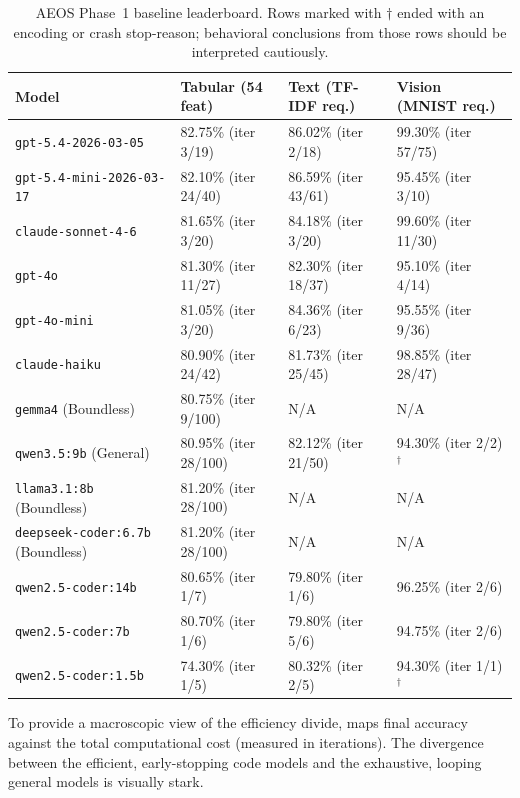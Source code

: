 \documentclass[11pt]{article}
\begin{document}
\begin{table}[H]
  \centering
  \caption{AEOS Phase~1 baseline leaderboard. Rows marked with $\dagger$ ended with an encoding or crash stop-reason; behavioral conclusions from those rows should be interpreted cautiously.}
  \label{tab:leaderboard}
  \small
  \begin{tabular}{@{}llll@{}}
    \toprule
    \textbf{Model} & \textbf{Tabular (54 feat)} & \textbf{Text (TF-IDF req.)} & \textbf{Vision (MNIST req.)} \\
    \midrule
    \texttt{gpt-5.4-2026-03-05} & 82.75\% (iter 3/19) & 86.02\% (iter 2/18) & 99.30\% (iter 57/75) \\
    \texttt{gpt-5.4-mini-2026-03-17} & 82.10\% (iter 24/40) & 86.59\% (iter 43/61) & 95.45\% (iter 3/10) \\
    \texttt{claude-sonnet-4-6} & 81.65\% (iter 3/20) & 84.18\% (iter 3/20) & 99.60\% (iter 11/30) \\
    \texttt{gpt-4o} & 81.30\% (iter 11/27) & 82.30\% (iter 18/37) & 95.10\% (iter 4/14) \\
    \texttt{gpt-4o-mini} & 81.05\% (iter 3/20) & 84.36\% (iter 6/23) & 95.55\% (iter 9/36) \\
    \texttt{claude-haiku} & 80.90\% (iter 24/42) & 81.73\% (iter 25/45) & 98.85\% (iter 28/47) \\
    \texttt{gemma4} (Boundless) & 80.75\% (iter 9/100) & N/A & N/A \\
    \texttt{qwen3.5:9b} (General) & 80.95\% (iter 28/100) & 82.12\% (iter 21/50) & 94.30\% (iter 2/2)$^\dagger$ \\
    \texttt{llama3.1:8b} (Boundless) & 81.20\% (iter 28/100) & N/A & N/A \\
    \texttt{deepseek-coder:6.7b} (Boundless) & 81.20\% (iter 28/100) & N/A & N/A \\
    \texttt{qwen2.5-coder:14b} & 80.65\% (iter 1/7) & 79.80\% (iter 1/6) & 96.25\% (iter 2/6) \\
    \texttt{qwen2.5-coder:7b} & 80.70\% (iter 1/6) & 79.80\% (iter 5/6) & 94.75\% (iter 2/6) \\
    \texttt{qwen2.5-coder:1.5b} & 74.30\% (iter 1/5) & 80.32\% (iter 2/5) & 94.30\% (iter 1/1)$^\dagger$ \\
    \bottomrule
  \end{tabular}
\end{table}

To provide a macroscopic view of the efficiency divide,  maps final accuracy against the total computational cost (measured in iterations). The divergence between the efficient, early-stopping code models and the exhaustive, looping general models is visually stark.
\end{document}
